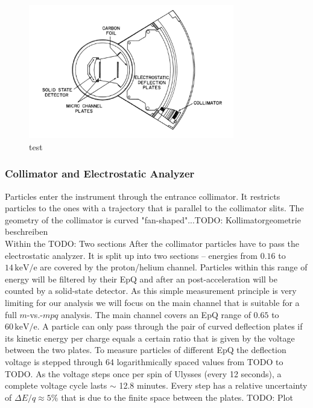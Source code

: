 \begin{figure}[h]
	\includegraphics[width=0.8\textwidth]{Figures/swics_sensor.pdf}
	\centering
	\caption{test}
	\label{fig:sensor_swics}
\end{figure}
\subsubsection{Collimator and Electrostatic Analyzer}
Particles enter the instrument through the entrance collimator. It restricts particles to the ones with a trajectory that is parallel to the collimator slits. The geometry of the collimator is curved "fan-shaped"...TODO: Kollimatorgeometrie beschreiben \\
Within the TODO: Two sections
After the collimator particles have to pass the electrostatic analyzer. It is split up into two sections -- energies from $0.16$ to $14\,\mathrm{keV/e}$ are covered by the proton/helium channel. Particles within this range of energy will be filtered by their EpQ and after an post-acceleration will be counted by a solid-state detector. 
As this simple measurement principle is very limiting for our analysis we will focus on the main channel that is suitable for a full $m$-vs.-$mpq$ analysis.
The main channel covers an EpQ range of $0.65$ to $60\,\mathrm{keV/e}$. A particle can only pass through the pair of curved deflection plates if its kinetic energy per charge equals a certain ratio that is given by the voltage between the two plates. To measure particles of different EpQ the deflection voltage is stepped through 64 logarithmically spaced values from TODO to TODO. As the voltage steps once per spin of Ulysses (every 12 seconds), a complete voltage cycle lasts $\sim$ 12.8 minutes. 
Every step has a relative uncertainty of $\Delta E/q \approx 5\%$ that is due to the finite space between the plates. TODO: Plot
  
